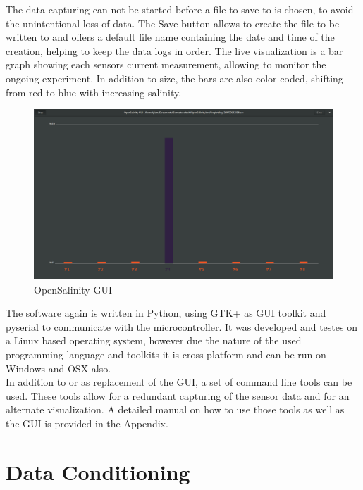 The data capturing can not be started before a file to save to is chosen, to avoid the unintentional loss of data. The Save button allows to create the file to be written to and offers a default file name containing the date and time of the creation, helping to keep the data logs in order.
The live visualization is a bar graph showing each sensors current measurement, allowing to monitor the ongoing experiment. In addition to size, the bars are also color coded, shifting from red to blue with increasing salinity.\\

\begin{figure}[H]
	\begin{center}
		\includegraphics[width=\textwidth]{images/UI.png}
		\caption{OpenSalinity GUI}
		\label{fig:opamp}
	\end{center}
\end{figure}

The software again is written in Python, using GTK+ as GUI toolkit and pyserial to communicate with the microcontroller. It was developed and testes on a Linux based operating system, however due the nature of the used programming language and toolkits it is cross-platform and can be run on Windows and OSX also.\\

In addition to or as replacement of the GUI, a set of command line tools can be used. These tools allow for a redundant capturing of the sensor data and for an alternate visualization. A detailed manual on how to use those tools as well as the GUI is provided in the Appendix.

\section{Data Conditioning}


